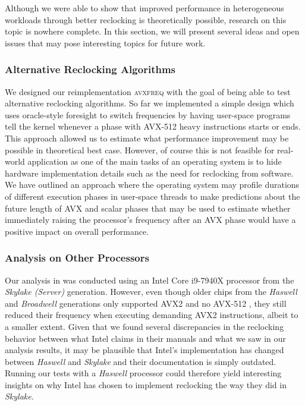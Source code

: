 Although we were able to show that improved performance in heterogeneous workloads through better reclocking is theoretically possible, research on this topic is nowhere complete. In this section, we will present several ideas and open issues that may pose interesting topics for future work.

\subsubsection{Alternative Reclocking Algorithms}
\label{sec:conclusion:futurework:algorithms}

We designed our reimplementation \textsc{avxfreq} with the goal of being able to test alternative reclocking algorithms. So far we implemented a simple design which uses oracle-style foresight to switch frequencies by having user-space programs tell the kernel whenever a phase with \gls{AVX-512} heavy instructions starts or ends. This approach allowed us to estimate what performance improvement may be possible in theoretical best case. However, of course this is not feasible for real-world application as one of the main tasks of an operating system is to hide hardware implementation details such as the need for reclocking from software. We have outlined an approach where the operating system may profile durations of different execution phases in user-space threads to make predictions about the future length of \gls{AVX} and scalar phases that may be used to estimate whether immediately raising the processor's frequency after an \gls{AVX} phase would have a positive impact on overall performance.

\subsubsection{Analysis on Other Processors}
\label{sec:conclusion:futurework:otherprocessors}

Our analysis in  was conducted using an Intel Core i9-7940X processor from the \textit{Skylake (Server)} generation. However, even though older chips from the \textit{Haswell} and \textit{Broadwell} generations only supported \gls{AVX2} and no \gls{AVX-512} \cite{intelhaswell} \cite{intelxeonscalabledeepdive}, they still reduced their frequency when executing demanding \gls{AVX2} instructions, albeit to a smaller extent. Given that we found several discrepancies in the reclocking behavior between what Intel claims in their manuals and what we saw in our analysis results, it may be plausible that Intel's implementation has changed between \textit{Haswell} and \textit{Skylake} and their documentation is simply outdated. Running our tests with a \textit{Haswell} processor could therefore yield interesting insights on why Intel has chosen to implement reclocking the way they did in \textit{Skylake}.


